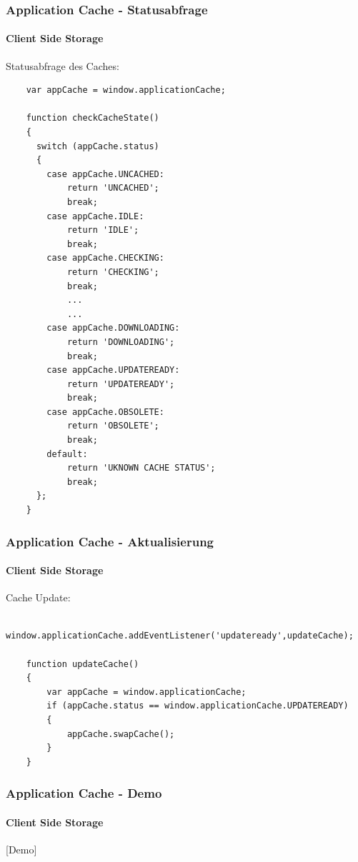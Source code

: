 
\begin{frame}
\frametitle{Application Cache - Statusabfrage}
\framesubtitle{Client Side Storage}
	
	Statusabfrage des Caches:
	
	\begin{lstlisting}
	var appCache = window.applicationCache;
		
	function checkCacheState()
	{
	  switch (appCache.status) 
	  {
	    case appCache.UNCACHED:
	        return 'UNCACHED';
	        break;
	    case appCache.IDLE:
	        return 'IDLE';
	        break;
	    case appCache.CHECKING:
	        return 'CHECKING';
	        break;
	        ...
	        ...
	    case appCache.DOWNLOADING: 
	        return 'DOWNLOADING';
	        break;
	    case appCache.UPDATEREADY:
	        return 'UPDATEREADY';
	        break;
	    case appCache.OBSOLETE: 
	        return 'OBSOLETE';
	        break;
	    default:
	        return 'UKNOWN CACHE STATUS';
	        break;
	  };
	}
	\end{lstlisting}	

\end{frame}
\begin{frame}[fragile]
\frametitle{Application Cache - Aktualisierung}
\framesubtitle{Client Side Storage}
	
	Cache Update:
	
	\begin{lstlisting}
	window.applicationCache.addEventListener('updateready',updateCache);
		
	function updateCache()
	{
	    var appCache = window.applicationCache;
		if (appCache.status == window.applicationCache.UPDATEREADY)
		{
			appCache.swapCache();
		}
	}
	\end{lstlisting}	

\end{frame}
\begin{frame}[fragile]
\frametitle{Application Cache - Demo}
\framesubtitle{Client Side Storage}
	
	\begin{center}
		[Demo]
	\end{center}

\end{frame}
